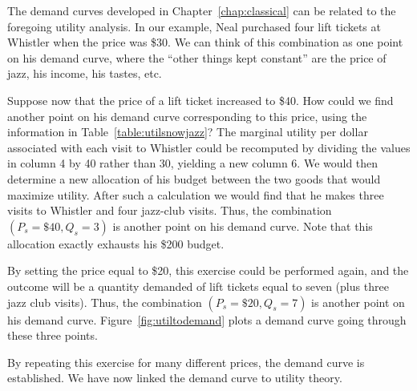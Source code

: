 The demand curves developed in Chapter~\ref{chap:classical} can be related to the foregoing utility analysis. In our example, Neal purchased four lift tickets at Whistler when the price was \$30. We can think of this combination as one point on his demand curve, where the ``other things kept constant'' are the price of jazz, his income, his tastes, etc.

Suppose now that the price of a lift ticket increased to \$40. How could we find another point on his demand curve corresponding to this price, using the information in Table~\ref{table:utilsnowjazz}? The marginal utility per dollar associated with each visit to Whistler could be recomputed by dividing the values in column 4 by 40 rather than 30, yielding a new column 6. We would then determine a new allocation of his budget between the two goods that would maximize utility. After such a calculation we would find that he makes three visits to Whistler and four jazz-club visits. Thus, the combination $(P_s=\$40,Q_s=3)$ is another point on his demand curve. Note that this allocation exactly exhausts his \$200 budget.

By setting the price equal to \$20, this exercise could be performed again, and the outcome will be a quantity demanded of lift tickets equal to seven (plus three jazz club visits). Thus, the combination $(P_s=\$20,Q_s=7)$ is another point on his demand curve. Figure~\ref{fig:utiltodemand} plots a demand curve going through these three points.



By repeating this exercise for many different prices, the demand curve is established. We have now linked the demand curve to utility theory.